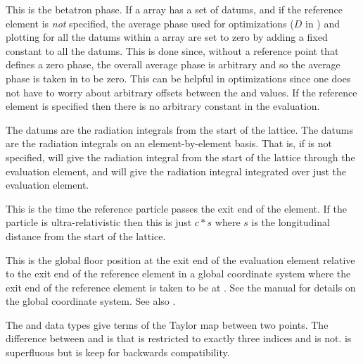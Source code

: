\begin{description}
{  
  \item[phase.] \Newline
This is the betatron phase.  If a  array has a set of
 datums, and if the reference element is {\em not}
specified, the average phase used for optimizations ($D$ in
) and plotting for all the datums within a 
array are set to zero by adding a fixed constant to all the datums.
This is done since, without a reference point that defines a zero
phase, the overall average phase is arbitrary and so the average phase
is taken in \tao to be zero. This can be helpful in optimizations
since one does not have to worry about arbitrary offsets between the
 and  values. If the reference element is
specified then there is no arbitrary constant in the evaluation.

  \item[rad_int, rad_int1] \Newline
The  datums are the radiation integrals from the start of
the lattice. The  datums are the radiation integrals on
an element-by-element basis. That is, if  is not specified,
 will give the radiation integral from the start of the 
lattice through the evaluation element, and  will give
the radiation integral integrated over just the evaluation element.

  \item[ref_time] \Newline
This is the time the reference particle passes the exit end of the element.
If the particle is ultra-relativistic then this is just $c * s$ where $s$
is the longitudinal distance from the start of the lattice.

  \item[rel\_floor.] \Newline
This is the global floor position at the exit end of the evaluation
element relative to the exit end of the reference element in a global
coordinate system where the exit end of the reference element is taken to be at
. See the \bmad manual for details on
the global coordinate system. See also .

  \item[t. tt.] \Newline
The  and  data types give terms of the Taylor map between
two points. The difference between  and  is that
 is restricted to exactly three indices and  is
not.  is superfluous but is keep for backwards compatibility.

}
\end{description}
